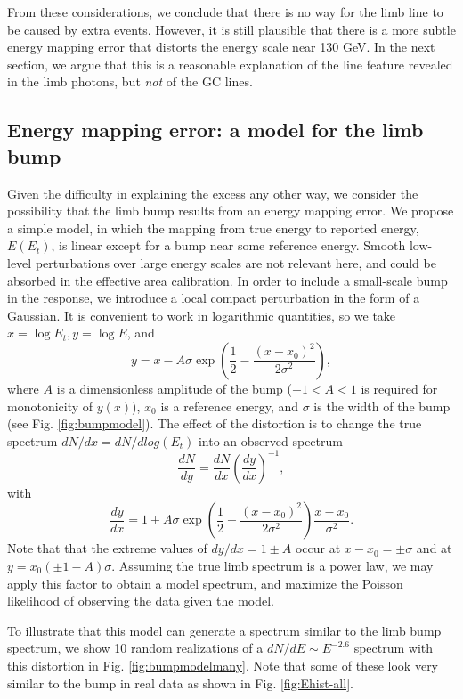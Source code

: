 \documentclass[aps,twocolumn,prd,superscriptaddress,showpacs,nofootinbib,fixfloat]{revtex4}
\newcommand{\be}{\begin{equation}}
\newcommand{\ee}{\end{equation}}
\begin{document}
From these considerations, we conclude that there is no way
for the limb line to be caused by extra events. However, it
is still plausible that there is a more subtle energy
mapping error that distorts the energy scale near 130 GeV.
In the next section, we argue that this is a reasonable
explanation of the line feature revealed in the limb
photons, but {\em not} of the GC lines. 

\subsection{Energy mapping error: a model for the limb bump}

 
Given the difficulty in explaining the excess any other way,
we consider the possibility that the limb bump results from
an energy mapping error.  We propose a simple model, in
which the mapping from true energy to reported energy,
$E(E_t)$, is linear except for a bump near some reference
energy.  Smooth low-level perturbations over large energy
scales are not relevant here, and could be absorbed in the
effective area calibration.  In order to include a
small-scale bump in the response, we introduce a local
compact perturbation in the form of a Gaussian.  It is
convenient to work in logarithmic quantities, so we take
$x=\log E_t, y=\log E$, and \be
\label{eq:yofx}
y=x - A\sigma \exp\left(\frac{1}{2}-\frac{(x-x_0)^2}{2\sigma^2}\right),
\ee
where $A$ is a dimensionless amplitude of the bump ($-1<A<1$
is required for monotonicity of $y(x)$), $x_0$ is a
reference energy, and $\sigma$ is the width of the bump (see
Fig. \ref{fig:bumpmodel}).  The effect of the distortion is
to change the true spectrum $dN/dx = dN/dlog(E_t)$ into an
observed spectrum
\be
\label{eq:dndy}
\frac{dN}{dy} = \frac{dN}{dx} \left(\frac{dy}{dx}\right)^{-1} ,
\ee
with
\be
\label{eq:dydx}
\frac{dy}{dx} = 1 + A\sigma \exp\left(\frac{1}{2}-\frac{(x-x_0)^2}{2\sigma^2}\right)
\frac{x-x_0}{\sigma^2}.
\ee
Note that that the extreme values of $dy/dx = 1 \pm A$ occur
at $x-x_0 = \pm \sigma$ and at $y=x_0(\pm1-A)\sigma$.
Assuming the true limb spectrum is a power law, we may apply
this factor to obtain a model spectrum, and maximize the
Poisson likelihood of observing the data given the model.

To illustrate that this model can generate a spectrum
similar to the limb bump spectrum, we show 10 random
realizations of a $dN/dE \sim E^{-2.6}$ spectrum with this
distortion in Fig. \ref{fig:bumpmodelmany}.  Note that some of these
look very similar to the bump in real data as shown in Fig. \ref{fig:Ehist-all}. 
\end{document}
